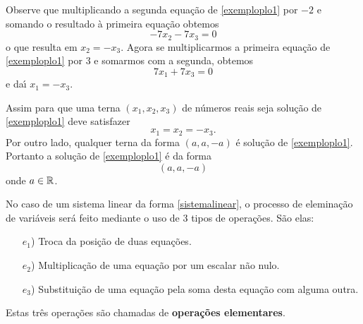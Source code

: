 Observe que multiplicando a segunda equa\c{c}\~ao de \eqref{exemploplo1} por $-2$ e somando o resultado \`a primeira equa\c{c}\~ao obtemos
\[
-7x_2 - 7x_3 = 0
\]
o que resulta em $x_2 = -x_3$. Agora se multiplicarmos a primeira equa\c{c}\~ao de \eqref{exemploplo1} por $3$ e somarmos com a segunda, obtemos
\[
7x_1 + 7x_3 = 0
\]
e da{\'\i} $x_1 = -x_3$.

Assim para que uma terna $(x_1, x_2, x_3)$ de n\'umeros reais seja solu\c{c}\~ao de \eqref{exemploplo1} deve satisfazer
\[
x_1 = x_2 = -x_3.
\]
Por outro lado, qualquer terna da forma $(a, a, -a)$ \'e solu\c{c}\~ao de \eqref{exemploplo1}. Portanto a solu\c{c}\~ao de \eqref{exemploplo1} \'e da forma
\[
(a, a, -a)
\]
onde $a \in \mathbb{R}$.

No caso de um sistema linear da forma \eqref{sistemalinear}, o processo de elemina\c{c}\~ao de vari\'aveis ser\'a feito mediante o uso de 3 tipos de opera\c{c}\~oes. S\~ao elas:
\begin{itemize}
	\item[$e_1$)] Troca da posi\c{c}\~ao de duas equa\c{c}\~oes.
	\item[$e_2$)] Multiplica\c{c}\~ao de uma equa\c{c}\~ao por um escalar n\~ao nulo.
	\item[$e_3$)] Substitui\c{c}\~ao de uma equa\c{c}\~ao pela soma desta equa\c{c}\~ao com alguma outra.
\end{itemize}

Estas tr\^es opera\c{c}\~oes s\~ao chamadas de \textbf{opera\c{c}\~oes elementares}.

